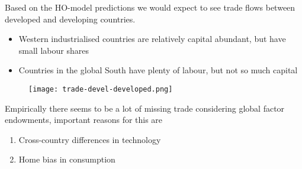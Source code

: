 \documentclass{beamer}
\begin{document}
\begin{frame}
 Based on the HO-model predictions we would expect to see trade flows between developed and developing countries.  
  \begin{itemize}
    \item Western industrialised countries are relatively capital abundant, but have small labour shares
    \item Countries in the global South have plenty of labour, but not so much capital
  \end{itemize}  
\end{frame}

\begin{frame}
  \begin{figure}
    \texttt{[image: trade-devel-developed.png]}
  \end{figure}
\end{frame}

\begin{frame}
Empirically there seems to be a lot of missing trade considering global factor endowments, important reasons for this are
  \begin{enumerate}
    \item Cross-country differences in technology
    \item Home bias in consumption
  \end{enumerate}
\end{frame}

\end{document}
